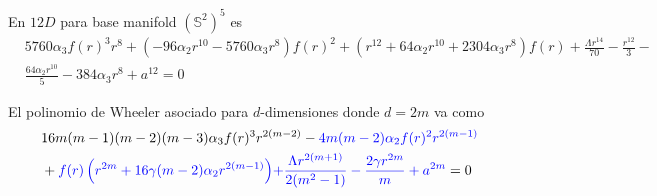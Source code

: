 En $12 D$ para base manifold $(\mathbb{S}^2)^5$ es
\begin{align*}
    &5760\alpha_3f(r)^3r^8+(-96\alpha_2r^{10}-5760\alpha_3r^8)f(r)^2+(r^{12}+64\alpha_2r^{10}+2304\alpha_3r^8)f(r)+\frac{\Lambda r^{14}}{70}-\frac{r^{12}}{3}-\\&\frac{64\alpha_2 r^{10}}{5}-384\alpha_3r^8+a^{12}=0
\end{align*}

El polinomio de Wheeler asociado para $d$-dimensiones donde $d=2m$ va como
\begin{align*}
    &16m(m-1)(m-2)(m-3)\alpha_3f(r)^3 r^{2(m-2)}-\textcolor{blue}{4m(m-2)\alpha_2f(r)^2r^{2(m-1)}}\\&+\textcolor{blue}{f(r)\left(r^{2m}+16\gamma(m-2)\alpha_2 r^{2(m-1)}\right)}\textcolor{blue}{+\frac{\Lambda r^{2(m+1)}}{2(m^2-1)}-\frac{2\gamma r^{2m}}{m}+a^{2m}}=0
\end{align*}
